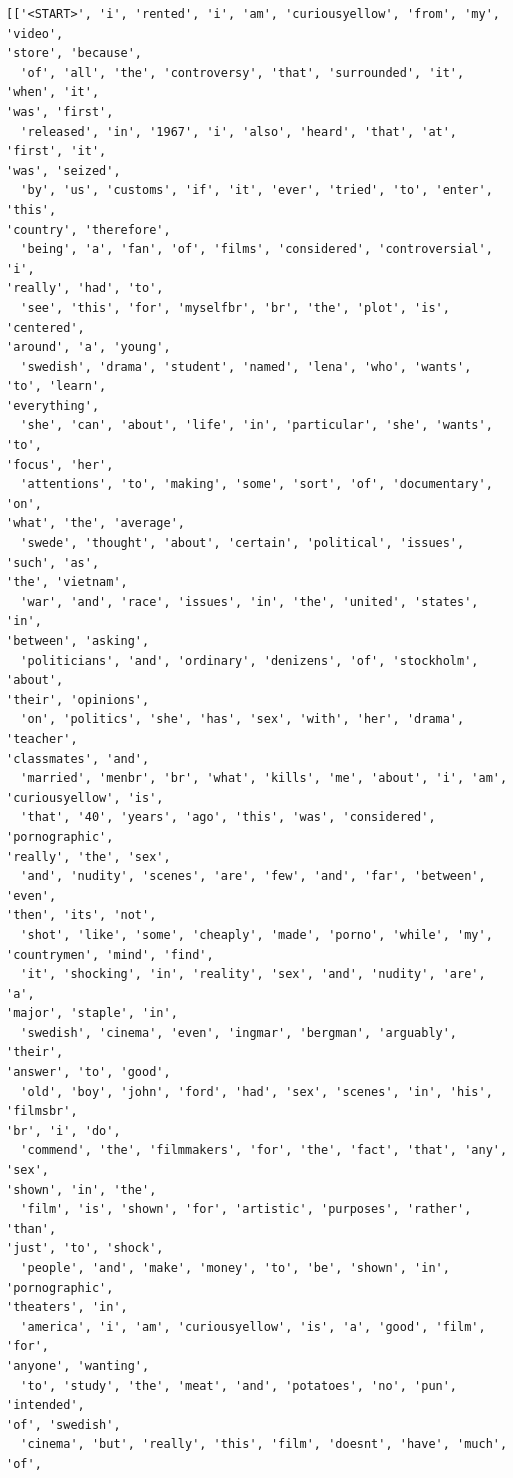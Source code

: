 \documentclass[11pt]{article}
\begin{document}
    \begin{Verbatim}[commandchars=\\\{\}]
[['<START>', 'i', 'rented', 'i', 'am', 'curiousyellow', 'from', 'my', 'video',
'store', 'because',
  'of', 'all', 'the', 'controversy', 'that', 'surrounded', 'it', 'when', 'it',
'was', 'first',
  'released', 'in', '1967', 'i', 'also', 'heard', 'that', 'at', 'first', 'it',
'was', 'seized',
  'by', 'us', 'customs', 'if', 'it', 'ever', 'tried', 'to', 'enter', 'this',
'country', 'therefore',
  'being', 'a', 'fan', 'of', 'films', 'considered', 'controversial', 'i',
'really', 'had', 'to',
  'see', 'this', 'for', 'myselfbr', 'br', 'the', 'plot', 'is', 'centered',
'around', 'a', 'young',
  'swedish', 'drama', 'student', 'named', 'lena', 'who', 'wants', 'to', 'learn',
'everything',
  'she', 'can', 'about', 'life', 'in', 'particular', 'she', 'wants', 'to',
'focus', 'her',
  'attentions', 'to', 'making', 'some', 'sort', 'of', 'documentary', 'on',
'what', 'the', 'average',
  'swede', 'thought', 'about', 'certain', 'political', 'issues', 'such', 'as',
'the', 'vietnam',
  'war', 'and', 'race', 'issues', 'in', 'the', 'united', 'states', 'in',
'between', 'asking',
  'politicians', 'and', 'ordinary', 'denizens', 'of', 'stockholm', 'about',
'their', 'opinions',
  'on', 'politics', 'she', 'has', 'sex', 'with', 'her', 'drama', 'teacher',
'classmates', 'and',
  'married', 'menbr', 'br', 'what', 'kills', 'me', 'about', 'i', 'am',
'curiousyellow', 'is',
  'that', '40', 'years', 'ago', 'this', 'was', 'considered', 'pornographic',
'really', 'the', 'sex',
  'and', 'nudity', 'scenes', 'are', 'few', 'and', 'far', 'between', 'even',
'then', 'its', 'not',
  'shot', 'like', 'some', 'cheaply', 'made', 'porno', 'while', 'my',
'countrymen', 'mind', 'find',
  'it', 'shocking', 'in', 'reality', 'sex', 'and', 'nudity', 'are', 'a',
'major', 'staple', 'in',
  'swedish', 'cinema', 'even', 'ingmar', 'bergman', 'arguably', 'their',
'answer', 'to', 'good',
  'old', 'boy', 'john', 'ford', 'had', 'sex', 'scenes', 'in', 'his', 'filmsbr',
'br', 'i', 'do',
  'commend', 'the', 'filmmakers', 'for', 'the', 'fact', 'that', 'any', 'sex',
'shown', 'in', 'the',
  'film', 'is', 'shown', 'for', 'artistic', 'purposes', 'rather', 'than',
'just', 'to', 'shock',
  'people', 'and', 'make', 'money', 'to', 'be', 'shown', 'in', 'pornographic',
'theaters', 'in',
  'america', 'i', 'am', 'curiousyellow', 'is', 'a', 'good', 'film', 'for',
'anyone', 'wanting',
  'to', 'study', 'the', 'meat', 'and', 'potatoes', 'no', 'pun', 'intended',
'of', 'swedish',
  'cinema', 'but', 'really', 'this', 'film', 'doesnt', 'have', 'much', 'of',

\end{Verbatim}
\end{document}
